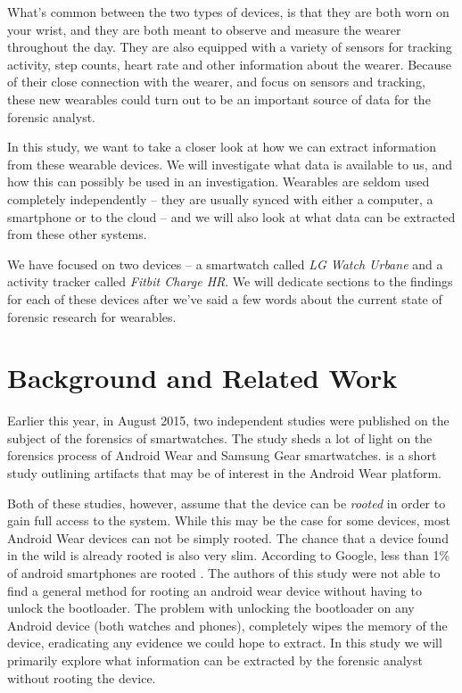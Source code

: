 \documentclass[a4paper,11pt,dvips]{article}
\begin{document}
What's common between the two types of devices, is that they are both worn on your wrist, and they are both meant to observe and measure the wearer throughout the day. They are also equipped with a variety of sensors for tracking activity, step counts, heart rate and other information about the wearer. Because of their close connection with the wearer, and focus on sensors and tracking, these new wearables could turn out to be an important source of data for the forensic analyst.

In this study, we want to take a closer look at how we can extract information from these wearable devices. We will investigate what data is available to us, and how this can possibly be used in an investigation. Wearables are seldom used completely independently -- they are usually synced with either a computer, a smartphone or to the cloud -- and we will also look at what data can be extracted from these other systems.

We have focused on two devices -- a smartwatch called \textit{LG Watch Urbane} and a activity tracker called \textit{Fitbit Charge HR}. We will dedicate sections to the findings for each of these devices after we've said a few words about the current state of forensic research for wearables.


\section{Background and Related Work}

Earlier this year, in August 2015, two independent studies were published on the subject of the forensics of smartwatches. The study \cite{baggili2015watch} sheds a lot of light on the forensics process of Android Wear and Samsung Gear smartwatches. \cite{rughanianalysis} is a short study outlining artifacts that may be of interest in the Android Wear platform.

Both of these studies, however, assume that the device can be \textit{rooted} in order to gain full access to the system. While this may be the case for some devices, most Android Wear devices can not be simply rooted. The chance that a device found in the wild is already rooted is also very slim. According to Google, less than 1\% of android smartphones are rooted \citep{Google:2014}. The authors of this study were not able to find a general method for rooting an android wear device without having to unlock the bootloader. The problem with unlocking the bootloader on any Android device (both watches and phones), completely wipes the memory of the device, eradicating any evidence we could hope to extract. In this study we will primarily explore what information can be extracted by the forensic analyst without rooting the device.
\end{document}
